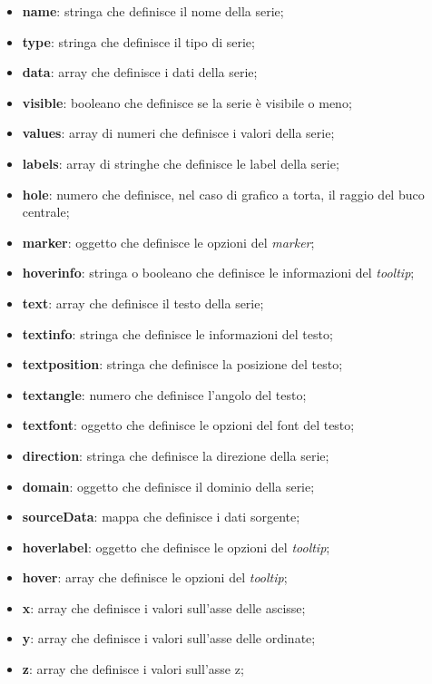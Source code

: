 \begin{itemize}
      \item \textbf{name}: stringa che definisce il nome della serie;
      \item \textbf{type}: stringa che definisce il tipo di serie;
      \item \textbf{data}: array che definisce i dati della serie;
      \item \textbf{visible}: booleano che definisce se la serie è visibile o meno;
      \item \textbf{values}: array di numeri che definisce i valori della serie;
      \item \textbf{labels}: array di stringhe che definisce le label della serie;
      \item \textbf{hole}: numero che definisce, nel caso di grafico a torta, il raggio del buco centrale;
      \item \textbf{marker}: oggetto che definisce le opzioni del \textit{marker};
      \item \textbf{hoverinfo}: stringa o booleano che definisce le informazioni del \textit{tooltip};
      \item \textbf{text}: array che definisce il testo della serie;
      \item \textbf{textinfo}: stringa che definisce le informazioni del testo;
      \item \textbf{textposition}: stringa che definisce la posizione del testo;
      \item \textbf{textangle}: numero che definisce l'angolo del testo;
      \item \textbf{textfont}: oggetto che definisce le opzioni del font del testo;
      \item \textbf{direction}: stringa che definisce la direzione della serie;
      \item \textbf{domain}: oggetto che definisce il dominio della serie;
      \item \textbf{sourceData}: mappa che definisce i dati sorgente;
      \item \textbf{hoverlabel}: oggetto che definisce le opzioni del \textit{tooltip};
      \item \textbf{hover}: array che definisce le opzioni del \textit{tooltip};
      \item \textbf{x}: array che definisce i valori sull'asse delle ascisse;
      \item \textbf{y}: array che definisce i valori sull'asse delle ordinate;
      \item \textbf{z}: array che definisce i valori sull'asse z;

\end{itemize}
